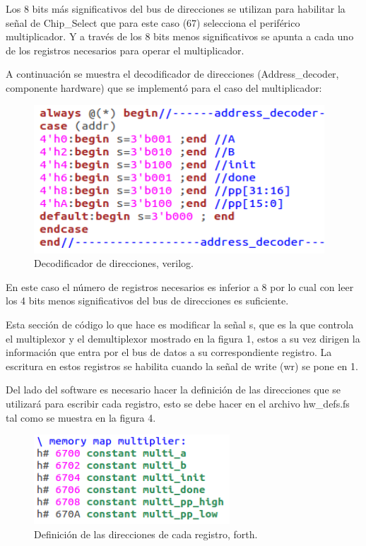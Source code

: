 \documentclass[a4paper,10pt]{article}
\begin{document}
Los 8 bits más significativos del bus de direcciones se utilizan para habilitar la señal de Chip\_Select que para este caso (67) selecciona el periférico multiplicador. Y  a través de los 8 bits menos significativos se apunta a cada uno de los registros necesarios para operar el multiplicador.

A continuación se muestra el decodificador de direcciones (Address\_decoder, componente hardware) que se implementó para el caso del multiplicador:

\begin{figure}[H]	%
  \centering
    \includegraphics[scale=0.7]{addres_dec_mult.png}
      \caption{Decodificador de direcciones, verilog.}
	\label{fig3}
\end{figure}

En este caso el número de registros necesarios es inferior a 8 por lo cual con leer los 4 bits menos significativos del bus de direcciones es suficiente.

Esta sección de código lo que hace es modificar la señal s, que es la que controla el multiplexor y el demultiplexor mostrado en la figura 1, estos a su vez dirigen la información que entra por el bus de datos a su correspondiente registro. La escritura en estos registros se habilita cuando la señal de write (wr) se pone en 1.

Del lado del software es necesario hacer la definición de las direcciones que se utilizará para escribir cada registro, esto se debe hacer en el archivo hw\_defs.fs tal como se muestra en la figura 4.

\begin{figure}[H]	%
  \centering
    \includegraphics[scale=0.8]{mem_map_forth_mult.png}
      \caption{Definición de las direcciones de cada registro, forth.}
	\label{fig4}
\end{figure}
\end{document}
